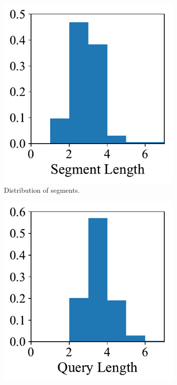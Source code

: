 \begin{figure}
	\centering
	\begin{subfigure}[b]{0.45\columnwidth}
		\centering
		\includegraphics[width=1\columnwidth]{figures/data-1.pdf}
		\caption[]%
		{{\small Distribution of segments.}}
		\label{fig:1}
	\end{subfigure}
	\hfill
	\begin{subfigure}[b]{0.45\columnwidth}
		\centering
		\includegraphics[width=1\columnwidth]{figures/data-2.pdf}

\end{subfigure}
\end{figure}
